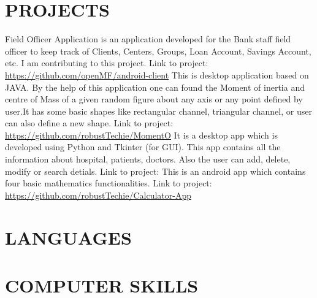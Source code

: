 \documentclass[11pt,a4paper,sans]{moderncv}        %
\begin{document}
\section{PROJECTS}
{Field Officer Application is an application developed for the Bank staff field officer to keep track of Clients, Centers, Groups, Loan Account, Savings Account, etc. I am contributing to this project. Link to project:{\newline} 
\url{https://github.com/openMF/android-client}}{}  %
{This is desktop application based on JAVA. By the help of this application one can found the Moment of inertia and centre of Mass of a given random figure about any axis or any point defined by user.It has some basic shapes like rectangular channel, triangular channel, or user can also define a new shape.  Link to project:{\newline}
\url{https://github.com/robustTechie/MomentO}}{}
{It is a desktop app which is developed using Python and Tkinter (for GUI). This app contains all the information about hospital, patients, doctors. Also the user can add, delete, modify or search detials. Link to project:{\newline}}{}   %
{This is an android app which contains four basic mathematics functionalities. Link to project:{\newline} 
\url{https://github.com/robustTechie/Calculator-App}}{}  %

\section{LANGUAGES}

\section{COMPUTER SKILLS}
\end{document}
